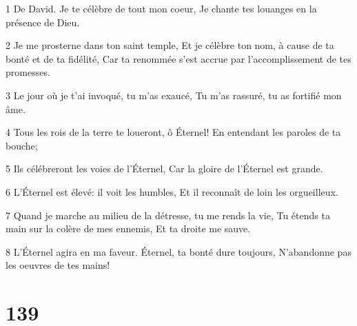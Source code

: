 \par 1 De David. Je te célèbre de tout mon coeur, Je chante tes louanges en la présence de Dieu.
\par 2 Je me prosterne dans ton saint temple, Et je célèbre ton nom, à cause de ta bonté et de ta fidélité, Car ta renommée s'est accrue par l'accomplissement de tes promesses.
\par 3 Le jour où je t'ai invoqué, tu m'as exaucé, Tu m'as rassuré, tu as fortifié mon âme.
\par 4 Tous les rois de la terre te loueront, ô Éternel! En entendant les paroles de ta bouche;
\par 5 Ils célébreront les voies de l'Éternel, Car la gloire de l'Éternel est grande.
\par 6 L'Éternel est élevé: il voit les humbles, Et il reconnaît de loin les orgueilleux.
\par 7 Quand je marche au milieu de la détresse, tu me rends la vie, Tu étends ta main sur la colère de mes ennemis, Et ta droite me sauve.
\par 8 L'Éternel agira en ma faveur. Éternel, ta bonté dure toujours, N'abandonne pas les oeuvres de tes mains!

\chapter{139}

